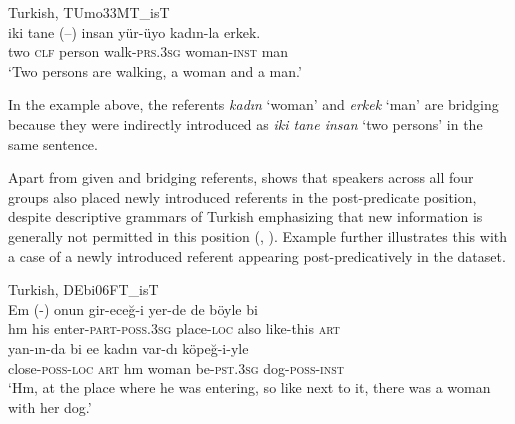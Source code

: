 \newpage
\ea%
  \label{ex:key:52} Turkish, TUmo33MT\_isT \\
    \gll iki  tane (--)  insan  yür-üyo  kadın-la  erkek. \\
two  \textsc{clf}    {}  person  walk\textsc{-prs.3sg}  woman\textsc{-inst}  man\\
\glt ‘Two persons are walking, a woman and a man.’   \\
  \z

In the example above, the referents \textit{kadın} ‘woman’ and \textit{erkek} ‘man’ are bridging because they were indirectly introduced as \textit{iki tane insan} ‘two persons’ in the same sentence.

Apart from given and bridging referents,  shows that speakers across all four groups also placed newly introduced referents in the post-predicate position, despite descriptive grammars of Turkish emphasizing that new information is generally not permitted in this position (\citealt{Kornfilt1997}, \citealt{GokselKerslake2004}). Example  further illustrates this with a case of a newly introduced referent appearing post-predicatively in the dataset.

\ea%
  \label{ex:key:53} Turkish, DEbi06FT\_isT \\
     \gll Em (-)  onun  gir-eceğ-i    yer-de    de  böyle    bi\\
 hm  {} his  enter-\textsc{part-poss.3sg}  place-\textsc{loc}  also  like-this  \textsc{art}\\
\gll yan-ın-da     bi  ee  kadın    var-dı    köpeğ-i-yle \\
close\textsc{-poss-loc}  \textsc{art}  hm  woman    be-\textsc{pst.3sg}  dog\textsc{-poss-inst}\\
\glt ‘Hm, at the place where he was entering, so like next to it, there was a woman with her dog.’ \\
  \z

